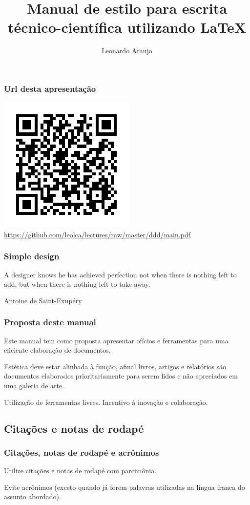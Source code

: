 \documentclass[10pt,notes,compress,aspectratio=169]{beamer}
\title[Manual de estilo]{Manual de estilo para escrita técnico-científica utilizando \LaTeX{}}
\author{Leonardo Araujo}
\institute{UFSJ}
\date{}
\begin{document}
\frame{\titlepage}

\begin{frame}
\frametitle{Url desta apresentação}
\centering
\includegraphics[width=0.5\linewidth,height=0.6\textheight,keepaspectratio]{figures/url.pdf}
\url{https://github.com/leolca/lectures/raw/master/ddd/main.pdf}
\end{frame}

\begin{frame}
\frametitle{Simple design}
\epigraph{A designer knows he has achieved perfection not when there is nothing left to add, but when there is nothing left to take away.}{Antoine de Saint-Exupéry}
\end{frame}


\begin{frame}
\frametitle{Proposta deste manual}
Este manual tem como proposta apresentar ofícios e ferramentas para uma eficiente elaboração
de documentos.
\pause

\vspace{3ex}
Estética deve estar alinhada à função, afinal livros, artigos e relatórios são documentos
elaborados prioritariamente para serem lidos e não apreciados em uma galeria de arte.
\pause

\vspace{3ex}
Utilização de ferramentas livres. Incentivo à inovação e colaboração.
\end{frame}











\subsection{Citações e notas de rodapé}
\begin{frame}
\frametitle{Citações, notas de rodapé e acrônimos}
Utilize citações e notas de rodapé com parcimônia.

\vspace{3ex}
Evite acrônimos (exceto quando já forem palavras utilizadas na língua franca do assunto abordado).
\end{frame}
\end{document}

